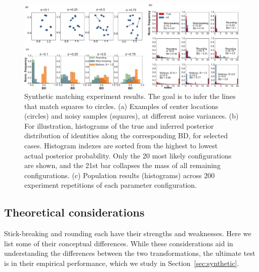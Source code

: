 \documentclass[twoside]{article}
\begin{document}
\begin{figure}[ht] 
   \centering
   \includegraphics[width=1.0\textwidth]{../figures/figure8.pdf}
   \caption{Synthetic matching experiment results. The goal is to infer the lines that match squares to circles. (a) Examples of center locations (circles) and noisy samples (squares), at different noise variances. (b) For illustration, histograms of the true and inferred posterior distribution of identities along the corresponding BD, for selected cases. Histogram indexes are sorted from the highest to lowest actual posterior probability. Only the 20 most likely configurations are shown, and the 21st bar collapses the mass of all remaining configurations. (c) Population results (histograms) across 200 experiment repetitions of each parameter configuration.}
   \label{fig:synthetic}
\end{figure}

\subsection{Theoretical considerations}

Stick-breaking and rounding each have their strengths and weaknesses.
Here we list some of their conceptual differences.  While these
considerations aid in understanding the differences between the
two transformations, the ultimate test is in their empirical
performance, which we study in Section~\ref{sec:synthetic}.
\end{document}
